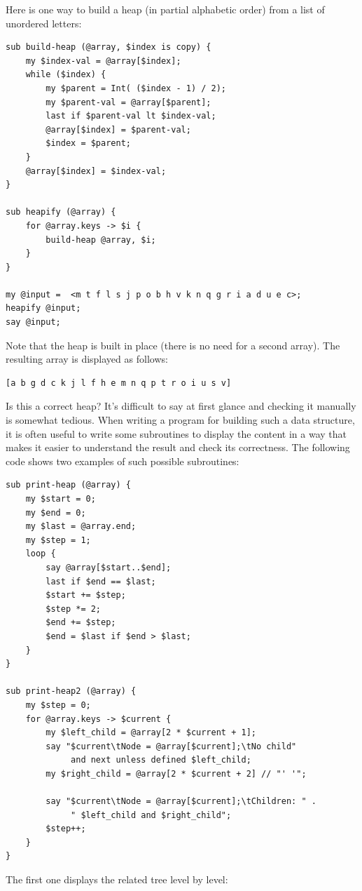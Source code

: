 Here is one way to build a heap (in partial alphabetic order) 
from a list of unordered letters:

\begin{verbatim}
sub build-heap (@array, $index is copy) {
    my $index-val = @array[$index];
    while ($index) {
        my $parent = Int( ($index - 1) / 2);
        my $parent-val = @array[$parent];
        last if $parent-val lt $index-val;
        @array[$index] = $parent-val;
        $index = $parent;
    }
    @array[$index] = $index-val;
}

sub heapify (@array) {
    for @array.keys -> $i {
        build-heap @array, $i;
    }
}

my @input =  <m t f l s j p o b h v k n q g r i a d u e c>; 
heapify @input;
say @input;
\end{verbatim}

Note that the heap is built in place (there is no 
need for a second array). The resulting array is 
displayed as follows:
\begin{verbatim}
[a b g d c k j l f h e m n q p t r o i u s v]
\end{verbatim}

Is this a correct heap? It's difficult to say at first 
glance and checking it manually is somewhat tedious. When 
writing a program for building such a data structure, 
it is often useful to write some subroutines to display 
the content in a way that makes it easier to understand 
the result and check its correctness. The following 
code shows two examples of such possible subroutines:
\begin{verbatim}
sub print-heap (@array) {
    my $start = 0;
    my $end = 0;
    my $last = @array.end;
    my $step = 1;
    loop {
        say @array[$start..$end];
        last if $end == $last;
        $start += $step;
        $step *= 2;
        $end += $step;
        $end = $last if $end > $last;
    } 
}

sub print-heap2 (@array) {
    my $step = 0;
    for @array.keys -> $current {
        my $left_child = @array[2 * $current + 1];
        say "$current\tNode = @array[$current];\tNo child" 
             and next unless defined $left_child;
        my $right_child = @array[2 * $current + 2] // "' '";
        
        say "$current\tNode = @array[$current];\tChildren: " . 
             " $left_child and $right_child";
        $step++;
    }
}
\end{verbatim}

The first one displays the related tree level by level:


